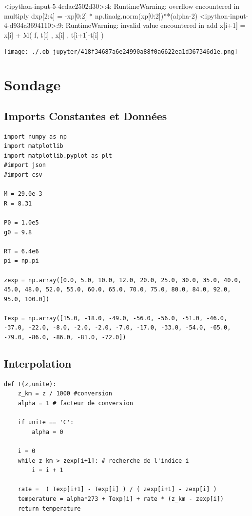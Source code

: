 \documentclass[11pt]{article}
\begin{document}
<ipython-input-5-4cdac2502d30>:4: RuntimeWarning: overflow encountered in multiply
  dxp[2:4] = -xp[0:2] * np.linalg.norm(xp[0:2])**(alpha-2)
<ipython-input-4-d934a3694110>:9: RuntimeWarning: invalid value encountered in add
  x[i+1] = x[i] + M( f, t[i] , x[i] , t[i+1]-t[i] )
\begin{center}
\texttt{[image: ./.ob-jupyter/418f34687a6e24990a88f0a6622ea1d367346d1e.png]}
\end{center}



\section{Sondage}
\label{sec:orgf1d47bf}

\subsection{Imports Constantes et Données}
\label{sec:org6c5d9e7}
\begin{verbatim}
import numpy as np
import matplotlib
import matplotlib.pyplot as plt
#import json
#import csv

M = 29.0e-3
R = 8.31

P0 = 1.0e5
g0 = 9.8

RT = 6.4e6
pi = np.pi

zexp = np.array([0.0, 5.0, 10.0, 12.0, 20.0, 25.0, 30.0, 35.0, 40.0, 45.0, 48.0, 52.0, 55.0, 60.0, 65.0, 70.0, 75.0, 80.0, 84.0, 92.0, 95.0, 100.0])

Texp = np.array([15.0, -18.0, -49.0, -56.0, -56.0, -51.0, -46.0, -37.0, -22.0, -8.0, -2.0, -2.0, -7.0, -17.0, -33.0, -54.0, -65.0, -79.0, -86.0, -86.0, -81.0, -72.0])

\end{verbatim}


\subsection{Interpolation}
\label{sec:orgc7f8cab}

\begin{verbatim}
def T(z,unite):
    z_km = z / 1000 #conversion
    alpha = 1 # facteur de conversion
    
    if unite == 'C':
        alpha = 0
        
    i = 0
    while z_km > zexp[i+1]: # recherche de l'indice i
        i = i + 1
        
    rate =  ( Texp[i+1] - Texp[i] ) / ( zexp[i+1] - zexp[i] )
    temperature = alpha*273 + Texp[i] + rate * (z_km - zexp[i])
    return temperature

\end{verbatim}
\end{document}
